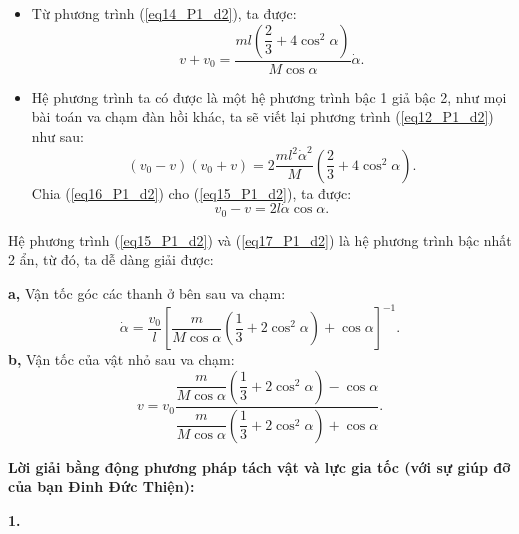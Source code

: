 \begin{itemize}
    \item Từ phương trình (\ref{eq14_P1_d2}), ta được:
    \begin{equation} \label{eq15_P1_d2}
        v+v_0 = \dfrac{ ml \left( \dfrac{2}{3} + 4 \cos^2 \alpha \right) }{ M \cos \alpha} \dot{\alpha}.
    \end{equation}
    \item Hệ phương trình ta có được là một hệ phương trình bậc 1 giả bậc 2, như mọi bài toán va chạm đàn hồi khác, ta sẽ viết lại phương trình (\ref{eq12_P1_d2}) như sau:
    \begin{equation} \label{eq16_P1_d2}
        (v_0-v)(v_0+v) = 2 \dfrac{ml^2 \dot{\alpha}^2}{M} \left( \dfrac{2}{3} + 4 \cos^2 \alpha \right).
    \end{equation}
    Chia (\ref{eq16_P1_d2}) cho (\ref{eq15_P1_d2}), ta được:
    \begin{equation} \label{eq17_P1_d2}
        v_0-v = 2l \dot{\alpha} \cos \alpha.
    \end{equation}
\end{itemize}
Hệ phương trình (\ref{eq15_P1_d2}) và (\ref{eq17_P1_d2}) là hệ phương trình bậc nhất 2 ẩn, từ đó, ta dễ dàng giải được:

\noindent \textbf{a,} Vận tốc góc các thanh ở bên sau va chạm:
\begin{equation} \label{eq18_P1_d2}
    \dot{\alpha} = \dfrac{v_0}{l} \left[ \dfrac{m}{M \cos \alpha} \left( \dfrac{1}{3} + 2 \cos^2 \alpha \right) + \cos \alpha \right]^{-1}.
\end{equation}
\noindent \textbf{b,} Vận tốc của vật nhỏ sau va chạm:
\begin{equation} \label{eq19_P1_d2}
    v = v_0 \dfrac{ \dfrac{m}{M \cos \alpha} \left( \dfrac{1}{3} + 2 \cos^2 \alpha \right) - \cos \alpha }{ \dfrac{m}{M \cos \alpha} \left( \dfrac{1}{3} + 2 \cos^2 \alpha \right) + \cos \alpha }.
\end{equation}

\vspace{6mm}

\noindent \textbf{Lời giải bằng động phương pháp tách vật và lực gia tốc (với sự giúp đỡ của bạn Đinh Đức Thiện):}

\noindent \textbf{1.}

